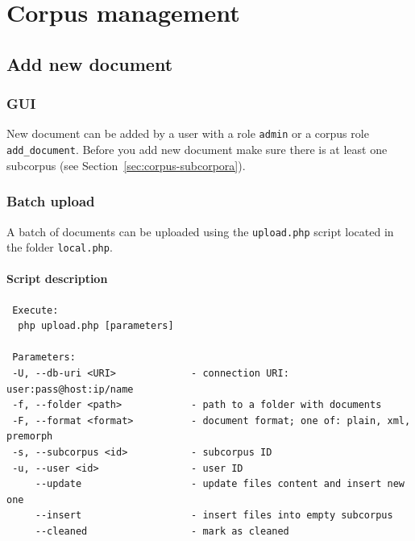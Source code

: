 \documentclass[a4paper,10pt,oneside]{scrbook}
\begin{document}
\chapter{Corpus management}
\section{Add new document}

\subsection{GUI}

New document can be added by a user with a role \verb|admin| or a corpus role \verb|add_document|. Before you add new document make sure there is at least one subcorpus (see Section~\ref{sec:corpus-subcorpora}).

\subsection{Batch upload}

A batch of documents can be uploaded using the \verb|upload.php| script located in the folder \verb|local.php|.

\subsubsection{Script description}
\begin{verbatim}
 Execute: 
  php upload.php [parameters]

 Parameters: 
 -U, --db-uri <URI>             - connection URI: user:pass@host:ip/name
 -f, --folder <path>            - path to a folder with documents
 -F, --format <format>          - document format; one of: plain, xml, premorph
 -s, --subcorpus <id>           - subcorpus ID
 -u, --user <id>                - user ID
     --update                   - update files content and insert new one
     --insert                   - insert files into empty subcorpus
     --cleaned                  - mark as cleaned 
\end{verbatim}
\end{document}
